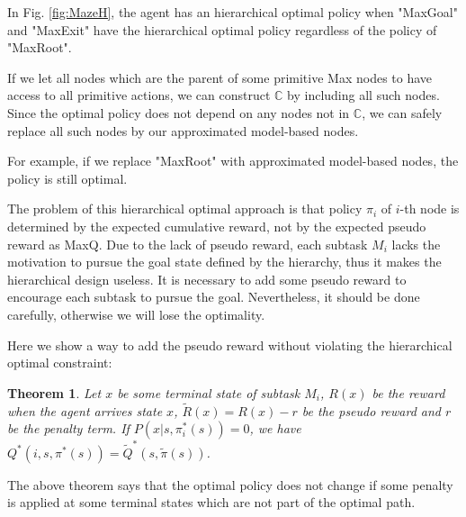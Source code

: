 \documentclass{article} %
\newtheorem{theorem}{Theorem}
\begin{document}

In Fig. \ref{fig:MazeH}, the agent has an hierarchical optimal policy when "MaxGoal" and "MaxExit"
have the hierarchical optimal policy regardless of the policy of "MaxRoot".

If we let all nodes which are the parent of some primitive Max nodes to have access
to all primitive actions, we can construct $\mathbb{C}$ by including all 
such nodes. Since the optimal policy does not depend on any nodes not in $\mathbb{C}$, 
we can safely replace all such nodes by our approximated model-based nodes.

For example, if we replace "MaxRoot" with approximated model-based nodes,
the policy is still optimal. 

The problem of this hierarchical optimal approach is that policy $\pi_i$ of $i$-th
node is determined by the expected cumulative reward, not by the expected pseudo reward as
MaxQ. Due to the lack of pseudo reward, each subtask $M_i$ lacks the motivation to 
pursue the goal state defined by the hierarchy, thus it makes the hierarchical 
design useless. 
It is necessary to add some pseudo reward to encourage each subtask to pursue 
the goal. Nevertheless, it should be done carefully, otherwise we will lose
the optimality.

Here we show a way to add the pseudo reward without violating the hierarchical 
optimal constraint:
\begin{theorem}
    Let $x$ be some terminal state of subtask $M_i$, $R(x)$ be the reward
    when the agent arrives state $x$, $\tilde{R}(x) = R(x) - r$ be the pseudo reward
    and $r$ be the penalty term.
    If $P(x| s, \pi_i^*(s)) = 0$, we have $Q^*(i, s, \pi^*(s)) = \tilde{Q}^*(s, \tilde{\pi}(s))$.
\end{theorem}

The above theorem says that the optimal policy does not change 
if some penalty is applied at some terminal states which are not part of the optimal path.
\end{document}
